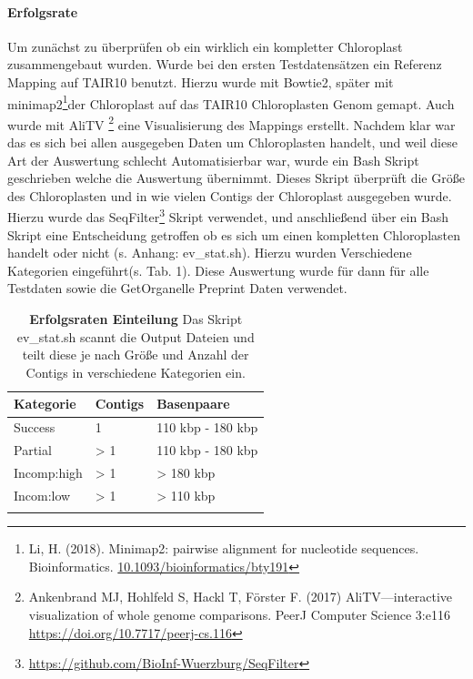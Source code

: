 \documentclass{scrartcl}
\begin{document}
\paragraph{Erfolgsrate}
\label{sec-3-1-2-2}
Um zunächst zu überprüfen ob ein wirklich ein kompletter Chloroplast zusammengebaut wurden. Wurde bei den ersten Testdatensätzen ein Referenz Mapping auf
TAIR10 benutzt. Hierzu wurde mit Bowtie2, später mit minimap2\footnote{Li, H. (2018). Minimap2: pairwise alignment for nucleotide sequences. Bioinformatics. \url{10.1093/bioinformatics/bty191}}der Chloroplast auf das TAIR10 Chloroplasten Genom gemapt. Auch wurde mit AliTV \footnote{Ankenbrand MJ, Hohlfeld S, Hackl T, Förster F. (2017) AliTV—interactive visualization of whole genome comparisons. PeerJ Computer Science 3:e116 \url{https://doi.org/10.7717/peerj-cs.116}} 
eine Visualisierung des Mappings erstellt. Nachdem klar war das es sich bei allen ausgegeben Daten um Chloroplasten handelt, und weil diese Art der 
Auswertung schlecht Automatisierbar war, wurde ein Bash Skript geschrieben welche die Auswertung übernimmt. Dieses Skript überprüft die Größe des
Chloroplasten und in wie vielen Contigs der Chloroplast ausgegeben wurde. Hierzu wurde das SeqFilter\footnote{\url{https://github.com/BioInf-Wuerzburg/SeqFilter}} Skript verwendet, und anschließend über ein Bash
Skript eine Entscheidung getroffen ob es sich um einen kompletten Chloroplasten handelt oder nicht (s. Anhang: ev\_stat.sh). Hierzu wurden Verschiedene
Kategorien eingeführt(s. Tab. 1). Diese Auswertung wurde für dann für alle Testdaten sowie die GetOrganelle Preprint Daten verwendet.
\begin{table}[!h]
\caption[Erfolgsraten Einteilung]{\textbf{Erfolgsraten Einteilung} Das Skript ev\_stat.sh scannt die Output Dateien und teilt diese je nach Größe und Anzahl der Contigs in verschiedene Kategorien ein. }
\begin{center}
\begin{tabular}{lll}
Kategorie & Contigs & Basenpaare\\
\hline
Success & 1 & 110 kbp - 180 kbp\\
Partial & > 1 & 110 kbp - 180 kbp\\
Incomp:high & > 1 & > 180 kbp\\
Incom:low & > 1 & > 110 kbp\\
 &  & \\
\end{tabular}
\end{center}
\end{table}
\end{document}
